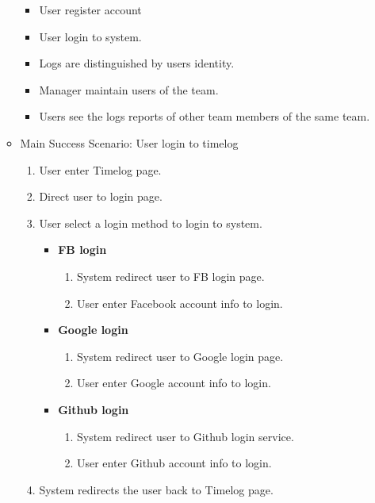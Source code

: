 \documentclass[12pt, a4paper]{article}
\begin{document}
\begin{CJK*}{UTF8}{bkai}
\begin{enumerate}
\begin{itemize}
            \begin{itemize}
              \item User register account
              \item User login to system.
              \item Logs are distinguished by users identity.
              \item Manager maintain users of the team.
              \item Users see the logs reports of other team members of the same team.
            \end{itemize}
          \item Main Success Scenario: User login to timelog
            \begin{enumerate}
              \item User enter Timelog page.
              \item Direct user to login page.
              \item User select a login method to login to system.
                \begin{itemize}
                  \item {\bf FB login}
                    \begin{enumerate}
                      \item System redirect user to FB login page.
                      \item User enter Facebook account info to login.
                    \end{enumerate}
                  \item {\bf Google login}
                    \begin{enumerate}
                      \item System redirect user to Google login page.
                      \item User enter Google account info to login.
                    \end{enumerate}
                  \item {\bf Github login}
                    \begin{enumerate}
                      \item System redirect user to Github login service.
                      \item User enter Github account info to login.
                    \end{enumerate}
                \end{itemize}
              \item System redirects the user back to Timelog page.

\end{enumerate}
\end{itemize}
\end{enumerate}
\end{CJK*}
\end{document}
